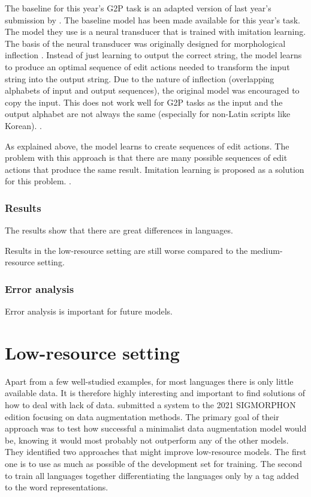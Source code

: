 The baseline for this year's G2P task is an adapted version of last year's submission by \citet{makarov-clematide-2020-cluzh}. The baseline model has been made available for this year's task. The model they use is a neural transducer that is trained with imitation learning. The basis of the neural transducer was originally designed for morphological inflection \citep{Aharoni&Goldberg.2016}. Instead of just learning to output the correct string, the model learns to produce an optimal sequence of edit actions needed to transform the input string into the output string. Due to the nature of inflection (overlapping alphabets of input and output sequences), the original model was encouraged to copy the input. This does not work well for G2P tasks as the input and the output alphabet are not always the same (especially for non-Latin scripts like Korean). . 

As explained above, the model learns to create sequences of edit actions. The problem with this approach is that there are many possible sequences of edit actions that produce the same result. Imitation learning is proposed as a solution for this problem. . 

\subsubsection*{Results}
The results show that there are great differences in languages.

Results in the low-resource setting are still worse compared to the medium-resource setting.  

\subsubsection*{Error analysis}
Error analysis is important for future models. 

\section{Low-resource setting}
Apart from a few well-studied examples, for most languages there is only little available data. It is therefore highly interesting and important to find solutions of how to deal with lack of data. \cite{hammond-2021-data} submitted a system to the 2021 SIGMORPHON edition focusing on data augmentation methods. The primary goal of their approach was to test how successful a minimalist data augmentation model would be, knowing it would most probably not outperform any of the other models. They identified two approaches that might improve low-resource models. The first one is to use as much as possible of the development set for training. The second to train all languages together differentiating the languages only by a tag added to the word representations. 




